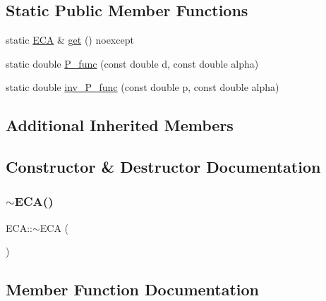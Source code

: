 \subsection*{Static Public Member Functions}
\begin{DoxyCompactItemize}
\item 
static \hyperlink{class_e_c_a}{E\+CA} \& \hyperlink{class_e_c_a_ac7d3fd1b819ca2200c0eb6817d464323}{get} () noexcept
\item 
static double \hyperlink{class_e_c_a_ad9a7a487c43cecdaea971ffba0098474}{P\+\_\+func} (const double d, const double alpha)
\item 
static double \hyperlink{class_e_c_a_ae39dbd10fc9c65479cbf6b7b09339590}{inv\+\_\+\+P\+\_\+func} (const double p, const double alpha)
\end{DoxyCompactItemize}
\subsection*{Additional Inherited Members}


\subsection{Constructor \& Destructor Documentation}
\mbox{\label{class_e_c_a_acc7762273f9df84a3457c8c9b4e58a31}} 
\subsubsection{\texorpdfstring{$\sim$\+E\+C\+A()}{~ECA()}}
{\footnotesize\ttfamily E\+C\+A\+::$\sim$\+E\+CA (\begin{DoxyParamCaption}{ }\end{DoxyParamCaption})}



\subsection{Member Function Documentation}
\mbox{\label{class_e_c_a_af8127c6291b457b8c7033f23d1656767}} 
